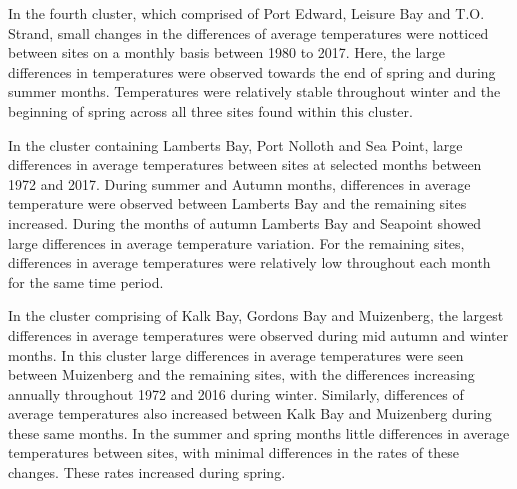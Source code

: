 \documentclass[12pt,]{article}
\begin{document}
In the fourth cluster, which comprised of Port Edward, Leisure Bay and
T.O. Strand, small changes in the differences of average temperatures
were notticed between sites on a monthly basis between 1980 to 2017.
Here, the large differences in temperatures were observed towards the
end of spring and during summer months. Temperatures were relatively
stable throughout winter and the beginning of spring across all three
sites found within this cluster.

In the cluster containing Lamberts Bay, Port Nolloth and Sea Point,
large differences in average temperatures between sites at selected
months between 1972 and 2017. During summer and Autumn months,
differences in average temperature were observed between Lamberts Bay
and the remaining sites increased. During the months of autumn Lamberts
Bay and Seapoint showed large differences in average temperature
variation. For the remaining sites, differences in average temperatures
were relatively low throughout each month for the same time period.

In the cluster comprising of Kalk Bay, Gordons Bay and Muizenberg, the
largest differences in average temperatures were observed during mid
autumn and winter months. In this cluster large differences in average
temperatures were seen between Muizenberg and the remaining sites, with
the differences increasing annually throughout 1972 and 2016 during
winter. Similarly, differences of average temperatures also increased
between Kalk Bay and Muizenberg during these same months. In the summer
and spring months little differences in average temperatures between
sites, with minimal differences in the rates of these changes. These
rates increased during spring.
\end{document}
